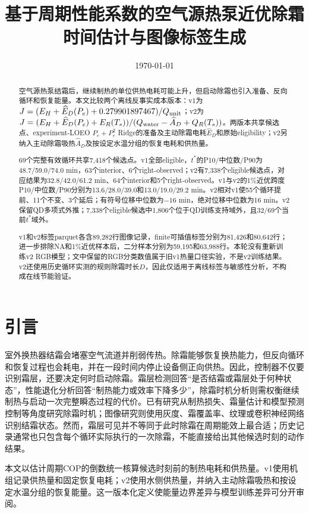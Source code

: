 \documentclass[UTF8,11pt,a4paper]{ctexart}
\title{基于周期性能系数的空气源热泵\newline 近优除霜时间估计与图像标签生成}
\author{}
\date{\today}
\begin{document}
\maketitle

\begin{abstract}
空气源热泵结霜后，继续制热的单位供热电耗可能上升，但启动除霜也引入准备、反向循环和恢复能量。本文比较两个离线反事实成本版本：v1为$J=(E_H+\widehat E_D(P_e)+0.279901897467)/Q_{\rm unit}$；v2为$J=(E_H+\widehat E_D(P_e)+E_R(T_s))/(Q_{\rm water}-\widehat A_D+Q_R(T_s))$。两版本共享候选点、experiment-LOEO $P_e+P_e^2$ Ridge的准备及主动除霜电耗$\widehat E_D$和原始eligibility；v2另纳入主动除霜吸热$\widehat A_D$及按设定水温分组的恢复电耗和供热量。

69个完整有效循环共享7,418个候选点。v1全部eligible，$t^*$的P10/中位数/P90为48.7/59.0/74.0 min，63个interior、6个right-observed；v2有7,338个eligible候选点，对应结果为32.8/42.0/61.2 min、64个interior和5个right-observed。v1与v2的1\%近优跨度P10/中位数/P90分别为13.6/28.0/39.0和13.0/19.0/29.2 min。v2相对v1使55个循环提前、11个不变、3个延后；有符号位移中位数为$-16$ min，绝对位移中位数为16 min。v2保留QD多项式外推；7,338个eligible候选中1,806个位于QD训练支持域外，且32/69个当前$t^*$域外。

v1和v2标签parquet各含89,282行图像记录，finite可插值标签分别为81,426和80,642行；进一步排除NA和1\%近优样本后，二分样本分别为59,195和63,988行。本轮没有重新训练v2 RGB模型；文中保留的RGB分类数值属于旧v1热量口径实验，不是v2训练结果。v2还使用历史循环实测的规则除霜时长$D$，因此仅适用于离线标签与敏感性分析，不构成在线节能验证。
\end{abstract}

\section{引言}
室外换热器结霜会堵塞空气流道并削弱传热。除霜能够恢复换热能力，但反向循环和恢复过程也会耗电，并在一段时间内停止设备侧正向供热。因此，控制器不仅要识别霜层，还要决定何时启动除霜。霜层检测回答“是否结霜或霜层处于何种状态”，性能退化分析回答“制热能力或效率下降多少”，除霜时机分析则需权衡继续制热与启动一次完整瞬态过程的代价。已有研究从制热损失、霜量估计和模型预测控制等角度研究除霜时机\citep{wang2020,li2020,chung2021,klingebiel2025}；图像研究则使用灰度、霜覆盖率、纹理或卷积神经网络识别结霜状态\citep{li2021image,xu2023glcm,chen2022,wang2024}。然而，霜层可见并不等同于此时除霜在周期能效上最合适；历史记录通常也只包含每个循环实际执行的一次除霜，不能直接给出其他候选时刻的动作结果。

本文以估计周期COP的倒数统一核算候选时刻前的制热电耗和供热量。v1使用机组记录供热量和固定恢复电耗；v2使用水侧供热量，并纳入主动除霜吸热和按设定水温分组的恢复能量。这一版本化定义使能量边界差异与模型训练差异可分开审阅。
\end{document}
